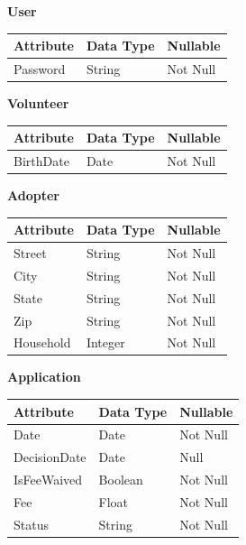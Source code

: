 \documentclass{article}
\begin{document}
\noindent\textbf{User}
\begin{table}[H]
    \begin{tabular}{|l|l|l|}
    \hline
    \textbf{Attribute} & \textbf{Data Type} & \textbf{Nullable} \\ \hline
    Password           & String             & Not Null          \\ \hline
    \end{tabular}
\end{table}

\noindent\textbf{Volunteer}
\begin{table}[H]
    \begin{tabular}{|l|l|l|}
    \hline
    \textbf{Attribute} & \textbf{Data Type} & \textbf{Nullable} \\ \hline
    BirthDate          & Date               & Not Null          \\ \hline 
    \end{tabular}
\end{table}

\noindent\textbf{Adopter}
\begin{table}[H]
    \begin{tabular}{|l|l|l|}
    \hline
    \textbf{Attribute} & \textbf{Data Type} & \textbf{Nullable} \\ \hline
    Street         & String             & Not Null          \\ \hline
    City           & String             & Not Null          \\ \hline
    State          & String             & Not Null          \\ \hline
    Zip            & String            & Not Null          \\ \hline
    Household      & Integer            & Not Null          \\ \hline
    \end{tabular}
\end{table}

\noindent \textbf{Application}
\begin{table}[H]
    \begin{tabular}{|l|l|l|}
    \hline
    \textbf{Attribute}       & \textbf{Data Type} & \textbf{Nullable} \\ \hline
    Date                     & Date               & Not Null          \\ \hline
    DecisionDate             & Date               & Null          \\ \hline
    IsFeeWaived              & Boolean            & Not Null          \\ \hline
    Fee                      & Float              & Not Null          \\ \hline
    Status                   & String             & Not Null          \\ \hline
    \end{tabular}
\end{table}
\end{document}
